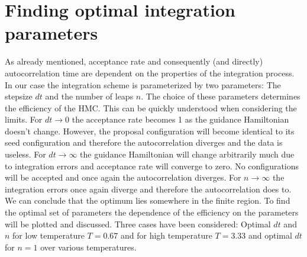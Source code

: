 \documentclass[11pt, a4paper]{scrartcl}
\begin{document}
\section{Finding optimal integration parameters}
    As already mentioned, acceptance rate and consequently (and directly) autocorrelation time are dependent on the properties of the integration process. In our case the integration scheme is parameterized by two parameters: The stepsize $dt$ and the number of leaps $n$. The choice of these parameters determines the efficiency of the HMC. This can be quickly understood when considering the limits. For $dt \rightarrow 0$ the acceptance rate becomes 1 as the guidance Hamiltonian doesn't change. However, the proposal configuration will become identical to its seed configuration and therefore the autocorrelation diverges and the data is useless. For $dt \rightarrow \infty$ the guidance Hamiltonian will change arbitrarily much due to integration errors and acceptance rate will converge to zero. No configurations will be accepted and once again the autocorrelation diverges. For $n \rightarrow \infty$ the integration errors once again diverge and therefore the autocorrelation does to. We can conclude that the optimum lies somewhere in the finite region. To find the optimal set of parameters the dependence of the efficiency on the parameters will be plotted and discussed. Three cases have been considered: Optimal $dt$ and $n$ for low temperature $T=0.67$ and for high temperature $T=3.33$ and optimal $dt$ for $n = 1$ over various temperatures.
\end{document}
